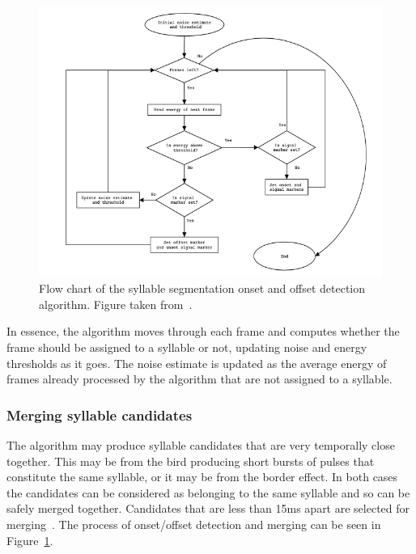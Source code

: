 \begin{figure}[ht]
  \centering
  \includegraphics[width=\textwidth]{figures/syllable_segmentation_flow.png}
  \caption{Flow chart of the syllable segmentation onset and offset detection
  algorithm. Figure taken
from~\cite{fagerlund2004automatic}.}\label{fig:syllable_segmentation_flow}
\end{figure}

In essence, the algorithm moves through each frame and computes whether the
frame should be assigned to a syllable or not, updating noise and energy
thresholds as it goes. The noise estimate is updated as the average energy of
frames already processed by the algorithm that are not assigned to a syllable.

\subsubsection{Merging syllable candidates}

The algorithm may produce syllable candidates that are very temporally close
together. This may be from the bird producing short bursts of pulses that
constitute the same syllable, or it may be from the border effect. In both cases
the candidates can be considered as belonging to the same syllable and so can be
safely merged together. Candidates that are less than 15ms apart are selected
for merging~\cite{fagerlund2004automatic}. The process of onset/offset detection
and merging can be seen in Figure~\ref{fig:syllable_segmentation_flow}.

